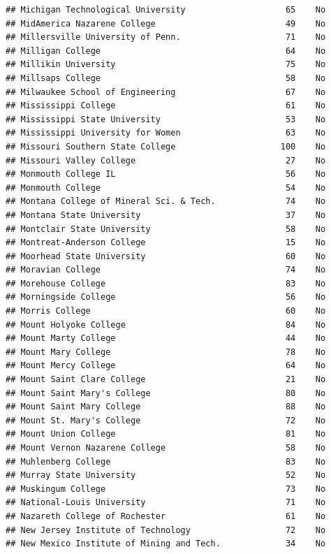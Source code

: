 \documentclass[
]{article}
\begin{document}
\begin{verbatim}
## Michigan Technological University                    65    No
## MidAmerica Nazarene College                          49    No
## Millersville University of Penn.                     71    No
## Milligan College                                     64    No
## Millikin University                                  75    No
## Millsaps College                                     58    No
## Milwaukee School of Engineering                      67    No
## Mississippi College                                  61    No
## Mississippi State University                         53    No
## Mississippi University for Women                     63    No
## Missouri Southern State College                     100    No
## Missouri Valley College                              27    No
## Monmouth College IL                                  56    No
## Monmouth College                                     54    No
## Montana College of Mineral Sci. & Tech.              74    No
## Montana State University                             37    No
## Montclair State University                           58    No
## Montreat-Anderson College                            15    No
## Moorhead State University                            60    No
## Moravian College                                     74    No
## Morehouse College                                    83    No
## Morningside College                                  56    No
## Morris College                                       60    No
## Mount Holyoke College                                84    No
## Mount Marty College                                  44    No
## Mount Mary College                                   78    No
## Mount Mercy College                                  64    No
## Mount Saint Clare College                            21    No
## Mount Saint Mary's College                           80    No
## Mount Saint Mary College                             88    No
## Mount St. Mary's College                             72    No
## Mount Union College                                  81    No
## Mount Vernon Nazarene College                        58    No
## Muhlenberg College                                   83    No
## Murray State University                              52    No
## Muskingum College                                    73    No
## National-Louis University                            71    No
## Nazareth College of Rochester                        61    No
## New Jersey Institute of Technology                   72    No
## New Mexico Institute of Mining and Tech.             34    No

\end{verbatim}
\end{document}

